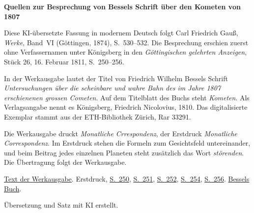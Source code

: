 \clearpage\thispagestyle{empty}
\begin{center}\textbf{Quellen zur Besprechung von Bessels Schrift über den Kometen von 1807}\end{center}
\noindent Diese KI-übersetzte Fassung in modernem Deutsch folgt Carl Friedrich Gauß, \textit{Werke}, Band~VI (Göttingen, 1874), S.~530--532. Die Besprechung erschien zuerst ohne Verfassernamen unter Königsberg in den \textit{Göttingischen gelehrten Anzeigen}, Stück 26, 16. Februar 1811, S.~250--256.
\par\smallskip\noindent In der Werkausgabe lautet der Titel von Friedrich Wilhelm Bessels Schrift \textit{Untersuchungen über die scheinbare und wahre Bahn des im Jahre 1807 erschienenen grossen Cometen}. Auf dem Titelblatt des Buchs steht \textit{Kometen}. Als Verlagsangabe nennt es Königsberg, Friedrich Nicolovius, 1810. Das digitalisierte Exemplar stammt aus der ETH-Bibliothek Zürich, Rar 33291.
\par\smallskip\noindent Die Werkausgabe druckt \textit{Monatliche Crrespondenz}, der Erstdruck \textit{Monatliche Correspondenz}. Im Erstdruck stehen die Formeln zum Gesichtsfeld untereinander, und beim Beitrag jedes einzelnen Planeten steht zusätzlich das Wort \textit{störenden}. Die Übertragung folgt der Werkausgabe.
\par\smallskip\noindent \href{https://gdz.sub.uni-goettingen.de/id/PPN236007467}{Text der Werkausgabe}. Erstdruck, \href{https://images.p.sub.uni-goettingen.de/iiif/image/gdz:PPN319721507_1811:00000282/full/1650,/0/default.jpg}{S.~250}, \href{https://images.p.sub.uni-goettingen.de/iiif/image/gdz:PPN319721507_1811:00000283/full/1650,/0/default.jpg}{S.~251}, \href{https://images.p.sub.uni-goettingen.de/iiif/image/gdz:PPN319721507_1811:00000284/full/1650,/0/default.jpg}{S.~252}, \href{https://images.p.sub.uni-goettingen.de/iiif/image/gdz:PPN319721507_1811:00000286/full/1650,/0/default.jpg}{S.~254}, \href{https://images.p.sub.uni-goettingen.de/iiif/image/gdz:PPN319721507_1811:00000288/full/1650,/0/default.jpg}{S.~256}. \href{https://doi.org/10.3931/e-rara-73147}{Bessels Buch}.
\par\smallskip\noindent Übersetzung und Satz mit KI erstellt.
\clearpage
